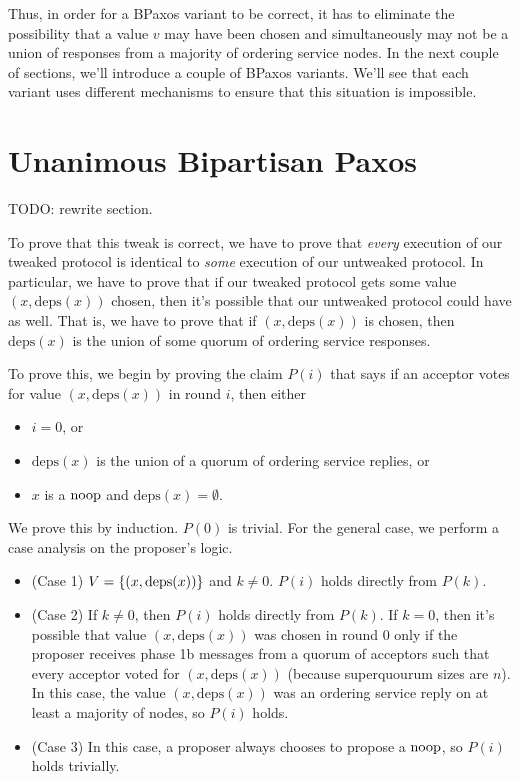 \documentclass{mwhittaker}
\theoremstyle{definition}
\newcommand{\deps}[1]{\text{deps}(#1)}
\begin{document}
Thus, in order for a BPaxos variant to be correct, it has to eliminate the
possibility that a value $v$ may have been chosen and simultaneously may not be
a union of responses from a majority of ordering service nodes. In the next
couple of sections, we'll introduce a couple of BPaxos variants. We'll see that
each variant uses different mechanisms to ensure that this situation is
impossible.

\section{Unanimous Bipartisan Paxos}
TODO: rewrite section.

To prove that this tweak is correct, we have to prove that \emph{every}
execution of our tweaked protocol is identical to \emph{some} execution of our
untweaked protocol. In particular, we have to prove that if our tweaked
protocol gets some value $(x, \deps{x})$ chosen, then it's possible that our
untweaked protocol could have as well. That is, we have to prove that if $(x,
\deps{x})$ is chosen, then $\deps{x}$ is the union of some quorum of ordering
service responses.

To prove this, we begin by proving the claim $P(i)$ that says if an acceptor
votes for value $(x, \deps{x})$ in round $i$, then either
\begin{itemize}
  \item $i = 0$, or
  \item $\deps{x}$ is the union of a quorum of ordering service replies, or
  \item $x$ is a $\text{noop}$ and $\deps{x} = \emptyset{}$.
\end{itemize}
We prove this by induction. $P(0)$ is trivial. For the general case, we perform
a case analysis on the proposer's logic.
\begin{itemize}
  \item (Case 1)
    $V = \set{(x, \deps{x})}$ and $k \neq 0$. $P(i)$ holds directly from
    $P(k)$.

  \item (Case 2)
    If $k \neq 0$, then $P(i)$ holds directly from $P(k)$. If $k = 0$, then
    it's possible that value $(x, \deps{x})$ was chosen in round $0$ only if
    the proposer receives phase 1b messages from a quorum of acceptors such
    that every acceptor voted for $(x, \deps{x})$ (because superquourum sizes
    are $n$). In this case, the value $(x, \deps{x})$ was an ordering service
    reply on at least a majority of nodes, so $P(i)$ holds.

  \item (Case 3)
    In this case, a proposer always chooses to propose a $\text{noop}$, so $P(i)$
    holds trivially.
\end{itemize}
\end{document}
